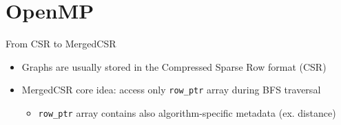 \section{OpenMP}

\begin{frame}{From CSR to MergedCSR}
\begin{itemize}
  \item<1-> Graphs are usually stored in the Compressed Sparse Row format (CSR)
  \item<2-> MergedCSR core idea: access only \texttt{row\_ptr} array during BFS traversal
  \begin{itemize}
    \item<2-> \texttt{row\_ptr} array contains also algorithm-specific metadata (ex. distance)
  \end{itemize}
\end{itemize}
\end{frame}
